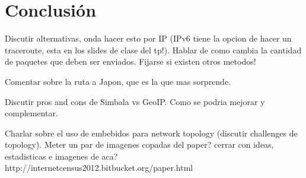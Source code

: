 \section{Conclusión}

Discutir alternativas, onda hacer esto por IP (IPv6 tiene la opcion de hacer un traceroute, esta en los slides de clase del tp!). Hablar de como cambia la cantidad de paquetes que deben ser enviados. Fijarse si existen otros metodos!

Comentar sobre la ruta a Japon, que es la que mas sorprende.

Discutir pros and cons de Simbala vs GeoIP. Como se podria mejorar y complementar.

Charlar sobre el uso de embebidos para network topology (discutir challenges de topology). Meter un par de imagenes copadas del paper? cerrar con ideas, estadisticas e imagenes de aca? http://internetcensus2012.bitbucket.org/paper.html